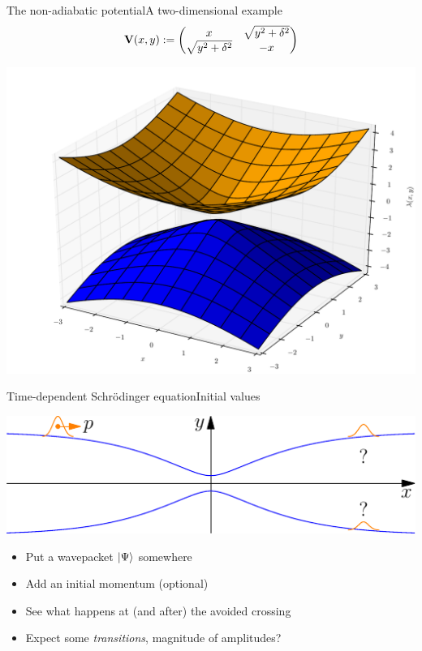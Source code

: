 \documentclass{beamer}
\begin{document}
\begin{frame}{The non-adiabatic potential}{A two-dimensional example}
  \begin{equation*}
    \mathbf{V}(x,y) :=
    \begin{pmatrix}
      x                   & \sqrt{y^2+\delta^2} \\
      \sqrt{y^2+\delta^2} & -x
    \end{pmatrix}
  \end{equation*}
  \begin{center}
    \includegraphics[scale=0.3]{./fig/conic_avoided.pdf}
  \end{center}
\end{frame}


\begin{frame}{Time-dependent Schrödinger equation}{Initial values}
  \begin{center}
    \includegraphics[scale=0.8]{./fig/iv.pdf}
  \end{center}
  \begin{itemize}
  \item Put a wavepacket $\Ket{\Psi}$ somewhere
  \item Add an initial momentum (optional)
  \item See what happens at (and after) the avoided crossing
  \item Expect some \emph{transitions}, magnitude of amplitudes?
  \end{itemize}
\end{frame}
\end{document}
